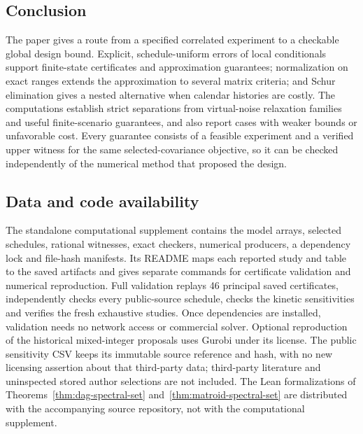 \subsection{Conclusion}

The paper gives a route from a specified correlated experiment to a
checkable global design bound. Explicit, schedule-uniform errors of local
conditionals support finite-state certificates and approximation guarantees;
normalization on exact ranges extends the approximation to several matrix
criteria; and Schur elimination gives a nested alternative when calendar
histories are costly. The computations establish strict separations from
virtual-noise relaxation families and useful finite-scenario guarantees, and
also report cases with weaker bounds or unfavorable cost. Every guarantee
consists of a feasible experiment and a verified upper witness for the same
selected-covariance objective, so it can be checked independently of the
numerical method that proposed the design.

\subsection*{Data and code availability}

The standalone computational supplement contains the model arrays, selected
schedules, rational witnesses, exact checkers, numerical producers, a
dependency lock and file-hash manifests. Its README maps each reported study
and table to the saved artifacts and gives separate commands for certificate
validation and numerical reproduction. Full validation replays 46 principal
saved certificates, independently checks every public-source schedule, checks
the kinetic sensitivities and verifies the fresh exhaustive studies. Once
dependencies are installed, validation needs no network access or commercial
solver. Optional reproduction of the historical mixed-integer proposals uses
Gurobi under its license. The public sensitivity CSV keeps its immutable
source reference \citep{MeasurementOpt2025} and hash, with no new licensing
assertion about that third-party data; third-party literature
and uninspected stored author selections are not included. The Lean
formalizations of Theorems~\ref{thm:dag-spectral-set}
and~\ref{thm:matroid-spectral-set} are distributed with the accompanying
source repository, not with the computational supplement.
